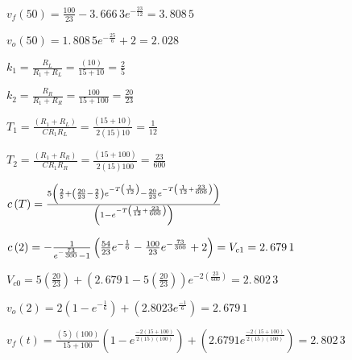 \documentclass{article}
\begin{document}
$v_{f}\left( 50\right) \allowbreak =\allowbreak \frac{100}{23}%
-3.\,\allowbreak 666\,3e^{-\frac{23}{12}}\allowbreak =\allowbreak
3.\,\allowbreak 808\,5$

$v_{o}\left( 50\right) =\allowbreak 1.\,\allowbreak 808\,5e^{-\frac{25}{6}%
}+2=\allowbreak 2.\,\allowbreak 028$

$k_{1}=\frac{R_{L}}{R_{1}+R_{L}}=\frac{\left( 10\right) }{15+10}=\allowbreak 
\frac{2}{5}$

$k_{2}=\frac{R_{R}}{R_{1}+R_{R}}=\frac{100}{15+100}=\allowbreak \frac{20}{23}
$

$T_{1}=\frac{\left( R_{1}+R_{L}\right) }{CR_{1}R_{L}}=\frac{\left(
15+10\right) }{2\left( 15\right) 10}=\allowbreak \frac{1}{12}$

$T_{2}=\frac{\left( R_{1}+R_{R}\right) }{CR_{1}R_{R}}=\frac{\left(
15+100\right) }{2\left( 15\right) 100}=\allowbreak \frac{23}{600}$

$c\left( T\right) =\frac{5\left( \frac{2}{5}+\left( \frac{20}{23}-\frac{2}{5}%
\right) e^{-T\left( \frac{1}{12}\right) }-\frac{20}{23}e^{-T\left( \frac{1}{%
12}+\frac{23}{600}\right) }\right) }{\left( 1-e^{-T\left( \frac{1}{12}+\frac{%
23}{600}\right) }\right) }$

$c\left( 2\right) =\allowbreak -\frac{1}{e^{-\frac{73}{300}}-1}\left( \frac{%
54}{23}e^{-\frac{1}{6}}-\frac{100}{23}e^{-\frac{73}{300}}+2\right)
\allowbreak =V_{c1}\allowbreak =2.\,\allowbreak 679\,1$

$V_{c0}=5\left( \frac{20}{23}\right) +\left( 2.\,\allowbreak 679\,1-5\left( 
\frac{20}{23}\right) \right) e^{-2\left( \frac{23}{600}\right) }=\allowbreak
2.\,\allowbreak 802\,3$

$v_{o}\left( 2\right) =2\left( 1-e^{-\frac{1}{6}}\right) +\left( \allowbreak
2.8023e^{\frac{-1}{6}}\right) =\allowbreak 2.\,\allowbreak 679\,1$

$v_{f}\left( t\right) =\frac{\left( 5\right) \left( 100\right) }{15+100}%
\left( 1-e^{\frac{-2\left( 15+100\right) }{2\left( 15\right) \left(
100\right) }}\right) +\left( 2.6791e^{\frac{-2\left( 15+100\right) }{2\left(
15\right) \left( 100\right) }}\right) =\allowbreak 2.\,\allowbreak 802\,3$
\end{document}
